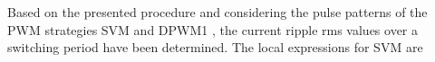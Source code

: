 \documentclass[10pt, onecolumn,conference]{IEEEtran}
\begin{document}
Based on the presented procedure and considering the pulse patterns of the PWM strategies SVM and DPWM1 \cite{Livros-Lipo}, the current ripple rms values over a switching period have been determined. The local expressions for SVM are
%
%
%
%
%
\end{document}
